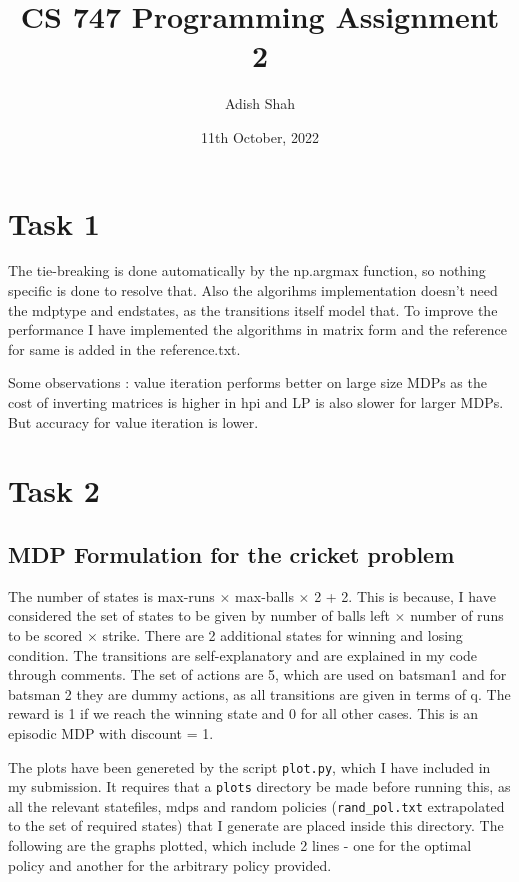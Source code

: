 \documentclass{article}
\begin{document}
\title{CS 747 Programming Assignment 2}
\author{Adish Shah}
\date{11th October, 2022}
\maketitle
\tableofcontents
\thispagestyle{empty}



\maketitle

\newpage
\thispagestyle{fancy}

\section{Task 1}
The tie-breaking is done automatically by the np.argmax function, so nothing specific is done to resolve that.
Also the algorihms implementation doesn't need the mdptype and endstates, as the transitions itself model that.
To improve the performance I have implemented the algorithms in matrix form and the reference for same is 
added in the reference.txt.

Some observations : value iteration performs better on large size MDPs as the cost of inverting matrices is higher in hpi and LP is also slower for larger MDPs. But accuracy for value iteration is lower.

\section{Task 2}
\subsection{MDP Formulation for the cricket problem}
The number of states is max-runs $\times$ max-balls $\times$ 2 + 2.
This is because, I have considered the set of states to be given by number of balls left $\times$ number of runs to be scored $\times$ strike.
There are 2 additional states for winning and losing condition. The transitions are self-explanatory and are
explained in my code through comments. The set of actions are 5, which are used on batsman1 and for batsman 2 they are dummy actions, as 
all transitions are given in terms of q. The reward is 1 if we reach the winning state and 0 for all other cases.
This is an episodic MDP with discount = 1.

The plots have been genereted by the script \verb!plot.py!, which I have included in my submission.
It requires that a \verb!plots! directory be made before running this, as all the relevant statefiles,
mdps and random policies (\verb!rand_pol.txt! extrapolated to the set of required states) that I generate are placed inside this directory.
The following are the graphs plotted, which include 2 lines - one for the optimal policy and 
another for the arbitrary policy provided.
\end{document}
